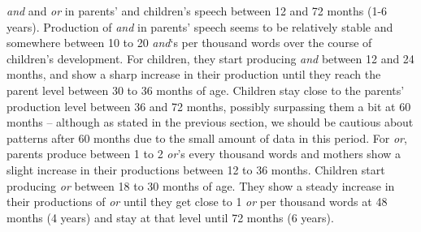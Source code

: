 \documentclass[oneside]{report}
\theoremstyle{definition}
\theoremstyle{definition}
\theoremstyle{definition}
\theoremstyle{remark}
\begin{document}
\emph{and} and \emph{or} in parents' and children's speech between 12
and 72 months (1-6 years). Production of \emph{and} in parents' speech
seems to be relatively stable and somewhere between 10 to 20
\emph{and}`s per thousand words over the course of children's
development. For children, they start producing \emph{and} between 12
and 24 months, and show a sharp increase in their production until they
reach the parent level between 30 to 36 months of age. Children stay
close to the parents' production level between 36 and 72 months,
possibly surpassing them a bit at 60 months -- although as stated in the
previous section, we should be cautious about patterns after 60 months
due to the small amount of data in this period. For \emph{or}, parents
produce between 1 to 2 \emph{or}'s every thousand words and mothers show
a slight increase in their productions between 12 to 36 months. Children
start producing \emph{or} between 18 to 30 months of age. They show a
steady increase in their productions of \emph{or} until they get close
to 1 \emph{or} per thousand words at 48 months (4 years) and stay at
that level until 72 months (6 years).
\end{document}
